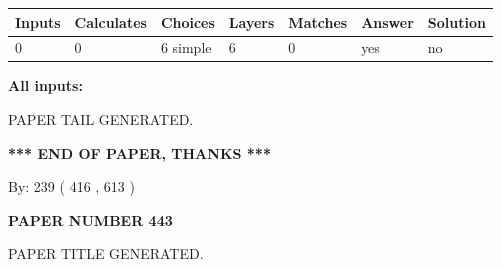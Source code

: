 \documentclass[12pt]{article}
\begin{document}
   
\noindent\begin{tabular}{|l|l|l|l|l|l|l|}
 \hline
Inputs & Calculates & Choices & Layers & Matches & Answer & Solution \\ \hline
 0  & 
 0  & 
 6
  simple  
  & 
 6  & 
 0  & 
  yes & 
  no 
  \\ \hline
 \end{tabular}
   
   
   
   
\noindent{}
   
   
   
   
\noindent\vspace{0.1in}\hspace{-0.08in} {\textbf{\Large{All inputs: }}}
   
   
   
   
   
   
 \vspace{0.2in}
 
   
   
\vspace{2.0in} PAPER TAIL GENERATED.
   
   
   
   
\vspace{1.0in} 
{\textbf{\large{ *** END OF PAPER, THANKS *** }}} 
   
   
\hspace{1.0in} By: 
 239 ( 416 ,  613 )
   
   
   
   
\newpage 
\setcounter{page}{ 
   443001 } 
   
   
   
   
 {\textbf{ \Large{ PAPER NUMBER  443  }}}
   
   
\vspace{0.2in}
   
   
   
   
   
   
   
   
 \vspace{0.2in}
 
 
 
 
   
   
 PAPER TITLE GENERATED.
   
   
   
\vspace{0.2in}
   
\end{document}
